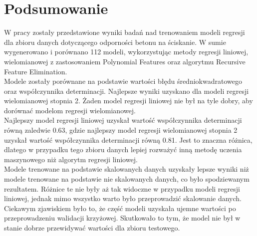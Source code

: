 \documentclass[11pt, a4paper, notitlepage]{report}
\begin{document}
\chapter{Podsumowanie}
W pracy zostały przedstawione wyniki badań nad trenowaniem modeli regresji dla zbioru danych dotyczącego odporności betonu na ściskanie.
W sumie wygenerowano i porównano 112 modeli, wykorzystując metody regresji liniowej, wielomianowej z zastosowaniem Polynomial Features oraz algorytmu Recursive Feature Elimination. \\
Modele zostały porównane na podstawie wartości błędu średniokwadratowego oraz współczynnika determinacji. Najlepsze wyniki uzyskano dla modeli regresji wielomianowej stopnia 2.
Żaden model regresji liniowej nie był na tyle dobry, aby dorównać modelom regresji wielomianowej. \\
Najlepszy model regresji liniowej uzyskał wartość współczynnika determinacji równą zaledwie 0.63,
gdzie najlepszy model regresji wielomianowej stopnia 2 uzyskał wartość współczynnika determinacji równą 0.81.
Jest to znaczna różnica, dlatego w przypadku tego zbioru danych lepiej rozważyć inną metodę uczenia maszynowego niż algorytm regresji liniowej. \\
Modele trenowane na podstawie skalowanych danych uzyskały lepsze wyniki niż modele trenowane na podstawie nie skalowanych danych, co było spodziewanym rezultatem.
Różnice te nie były aż tak widoczne w przypadku modeli regresji liniowej, jednak mimo wszystko warto było przeprowadzić skalowanie danych. \\
Ciekawym zjawiskiem było to, że część modeli uzyskała ujemne wartości po przeprowadzeniu walidacji krzyżowej. Skutkowało to tym, że model nie był w stanie dobrze przewidywać wartości dla zbioru testowego. \\
\end{document}

